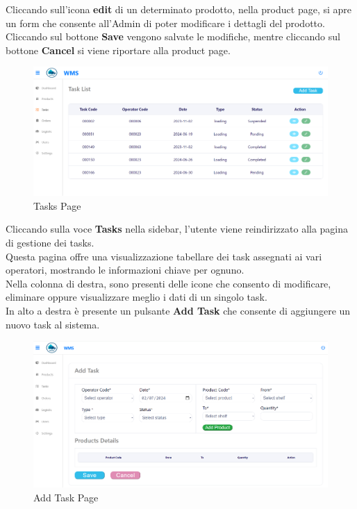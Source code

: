 Cliccando sull'icona \textbf{edit} di un determinato prodotto, nella product page, si apre un form che consente
all'Admin di poter modificare i dettagli del prodotto.\\
Cliccando sul bottone \textbf{Save} vengono salvate le modifiche, mentre cliccando sul bottone \textbf{Cancel} si viene
riportare alla product page.

\begin{figure}[H]
    \centering
    \includegraphics[width=\textwidth]{document/sections/img/Storyboard/taskPage.png}
    \caption{Tasks Page}
    \label{fig:tasksPage}
\end{figure}

Cliccando sulla voce \textbf{Tasks} nella sidebar, l'utente viene reindirizzato alla pagina di gestione dei tasks.\\
Questa pagina offre una visualizzazione tabellare dei task assegnati ai vari operatori,
mostrando le informazioni chiave per ognuno.\\
Nella colonna di destra, sono presenti delle icone che consento di modificare, eliminare oppure visualizzare meglio
i dati di un singolo task.\\
In alto a destra è presente un pulsante \textbf{Add Task} che consente di aggiungere un nuovo task al sistema.

\begin{figure}[H]
    \centering
    \includegraphics[width=\textwidth]{document/sections/img/Storyboard/addTaskPage.png}
    \caption{Add Task Page}
    \label{fig:addTaskPages}
\end{figure}

